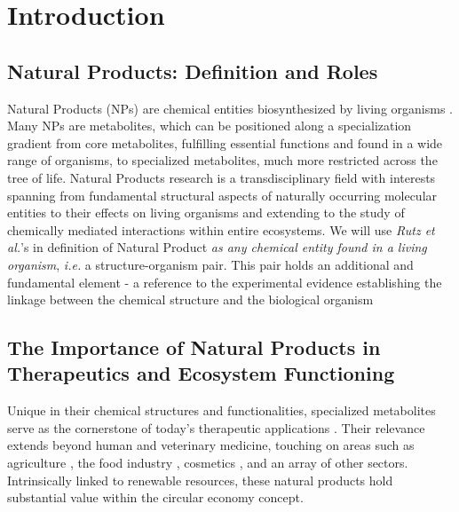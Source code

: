 \documentclass[
11pt, %
english, %
singlespacing, %
headsepline, %
chapterinoneline, %
]{MastersDoctoralThesis} %
\begin{document}
%
% 
%
% 
% 
%

\chapter{Introduction}\label{chap:intro}

\section{Natural Products: Definition and Roles}\label{sec:NP def and roles}
Natural Products (NPs) are chemical entities biosynthesized by living organisms \cite{AllNatural2007}. Many NPs are metabolites, which can be positioned along a specialization gradient from core metabolites, fulfilling essential functions and found in a wide range of organisms, to specialized metabolites, much more restricted across the tree of life. Natural Products research is a transdisciplinary field with interests spanning from fundamental structural aspects of naturally occurring molecular entities to their effects on living organisms and extending to the study of chemically mediated interactions within entire ecosystems. We will use \textit{Rutz et al.}'s in \cite{rutzLOTUSInitiativeOpen2022} definition of Natural Product \textit{as any chemical entity found in a living organism}, \textit{i.e.} a structure-organism pair. This pair holds an additional and fundamental element - a reference to the experimental evidence establishing the linkage between the chemical structure and the biological organism

\section{The Importance of Natural Products in Therapeutics and Ecosystem Functioning}
Unique in their chemical structures and functionalities, specialized metabolites serve as the cornerstone of today's therapeutic applications \cite{harveyReemergenceNaturalProducts2015}. Their relevance extends beyond human and veterinary medicine, touching on areas such as agriculture \cite{yanImpactProspectNatural2018}, the food industry \cite{gonzalez-manzanoApplicationsNaturalProducts2021}, cosmetics \cite{liuNaturalProductsCosmetics2022}, and an array of other sectors. Intrinsically linked to renewable resources, these natural products hold substantial value within the circular economy concept.
\end{document}
